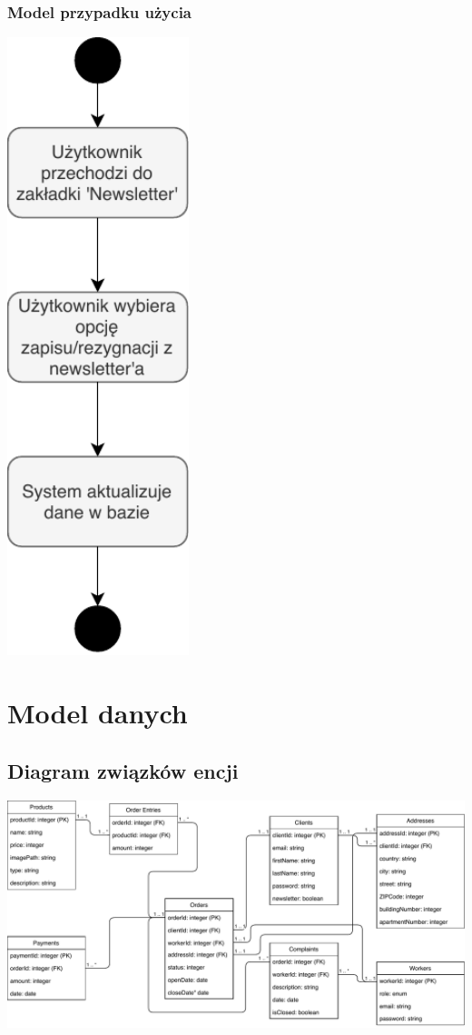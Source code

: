 \documentclass[12pt]{report}
\begin{document}
	\subsection{Model przypadku użycia}
	\begin{center}
		\includegraphics[width=150pt]{newsletter.pdf}
	\end{center}
	\newpage
	

	\renewcommand{\thesection}{\thechapter.\arabic{section}}		
	
	\chapter{Model danych}
	
	\section{Diagram związków encji}
	\includegraphics[width=500pt]{database.pdf}
	
\end{document}
